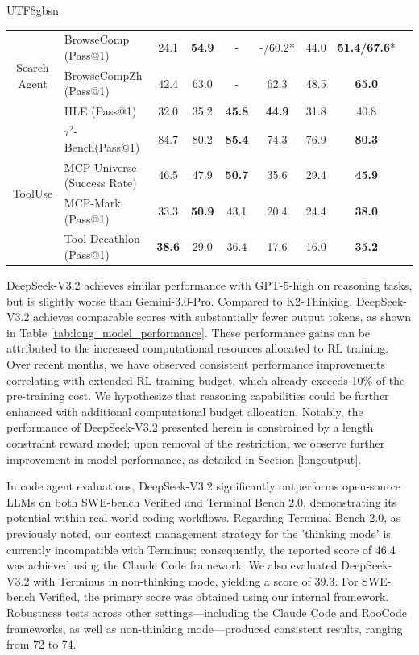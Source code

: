 \documentclass[11pt, a4paper, logo, copyright, nonumbering]{deepseek}
\def\newmodel{DeepSeek-V3.2}
\begin{document}
\begin{CJK*}{UTF8}{gbsn}
\begin{table}[htbp]
\begin{tabular}{@{}c l | c  c  c | c c c c @{}}
    \multirow{3}{*}{Search Agent} & BrowseComp {\tiny (Pass@1)}  & 24.1 & \textbf{54.9} & - & -/60.2* & 44.0& \textbf{51.4/67.6}* \\
    & BrowseCompZh {\tiny (Pass@1)}  & 42.4 & 63.0 & - & 62.3 & 48.5 & \textbf{65.0} \\
    & HLE {\tiny (Pass@1)}  &32.0 & 35.2 & \textbf{45.8} & \textbf{44.9} & 31.8 & 40.8 \\ \midrule

         \multirow{4}{*}{ToolUse}  &$\tau^2$-Bench{\tiny (Pass@1)} & 84.7& 80.2& \textbf{85.4} &74.3 & 76.9 & \textbf{80.3}\\
         & MCP-Universe \tiny{(Success Rate)}  & 46.5 & 47.9 & \textbf{50.7} & 35.6 &29.4 & \textbf{45.9} \\
      &  MCP-Mark {\tiny (Pass@1)} &33.3 & \textbf{50.9} & 43.1 &20.4 &24.4 & \textbf{38.0}\\
      & Tool-Decathlon {\tiny (Pass@1)}  & \textbf{38.6} & 29.0 &36.4 & 17.6& 16.0& \textbf{35.2} \\  
      
    \bottomrule
    \end{tabular}
    
    \label{tab:main}
\end{table}

\newmodel{} achieves similar performance with GPT-5-high on reasoning tasks, but is slightly worse than Gemini-3.0-Pro. Compared to K2-Thinking, \newmodel{} achieves comparable scores with substantially fewer output tokens, as shown in Table \ref{tab:long_model_performance}. These performance gains can be attributed to the increased computational resources allocated to RL training. Over recent months, we have observed consistent performance improvements correlating with extended RL training budget, which already exceeds 10\% of the pre-training cost. We hypothesize that reasoning capabilities could be further enhanced with additional computational budget allocation. Notably, the performance of \newmodel{} presented herein is constrained by a length constraint reward model; upon removal of the restriction, we observe further improvement in model performance, as detailed in Section \ref{longoutput}.

In code agent evaluations, \newmodel{} significantly outperforms open-source LLMs on both SWE-bench Verified and Terminal Bench 2.0, demonstrating its potential within real-world coding workflows. Regarding Terminal Bench 2.0, as previously noted, our context management strategy for the 'thinking mode' is currently incompatible with Terminus; consequently, the reported score of 46.4 was achieved using the Claude Code framework. We also evaluated \newmodel{} with Terminus in non-thinking mode, yielding a score of 39.3. For SWE-bench Verified, the primary score was obtained using our internal framework. Robustness tests across other settings—including the Claude Code and RooCode frameworks, as well as non-thinking mode—produced consistent results, ranging from 72 to 74.


\end{CJK*}
\end{document}
